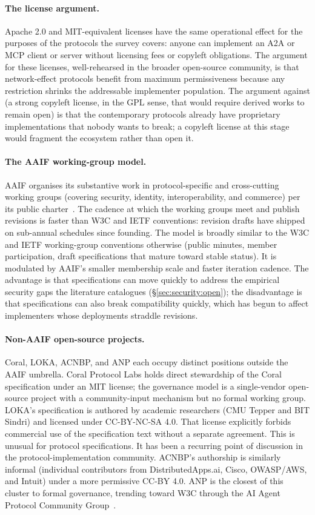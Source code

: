 \paragraph{The license argument.}
Apache 2.0 and MIT-equivalent licenses have the same
operational effect for the purposes of the protocols
the survey covers: anyone can implement an A2A or MCP
client or server without licensing fees or copyleft
obligations. The argument for these licenses, well-rehearsed
in the broader open-source community, is that
network-effect protocols benefit from maximum permissiveness
because any restriction shrinks the addressable
implementer population. The argument against (a strong
copyleft license, in the GPL sense, that would require
derived works to remain open) is that the contemporary
protocols already have proprietary implementations that
nobody wants to break; a copyleft license at this stage
would fragment the ecosystem rather than open it.

\paragraph{The AAIF working-group model.}
AAIF organises its substantive work in protocol-specific
and cross-cutting working groups (covering security,
identity, interoperability, and commerce) per its
public charter~\cite{lf_aaif}. The cadence at which the
working groups meet and publish revisions is faster than
W3C and IETF conventions: revision drafts have shipped on
sub-annual schedules since founding. The model is broadly
similar to the W3C and IETF working-group conventions
otherwise (public minutes, member participation, draft
specifications that mature toward stable status). It is
modulated by AAIF's smaller membership scale and faster
iteration cadence. The advantage is that specifications
can move quickly to address the empirical security gaps
the literature catalogues (\S\ref{sec:security:open}); the
disadvantage is that specifications can also break
compatibility quickly, which has begun to affect
implementers whose deployments straddle revisions.

\paragraph{Non-AAIF open-source projects.}
Coral, LOKA, ACNBP, and ANP each occupy distinct
positions outside the AAIF umbrella.
Coral Protocol Labs holds direct stewardship of the
Coral specification under an MIT license; the
governance model is a single-vendor open-source project
with a community-input mechanism but no formal working
group. LOKA's specification is authored by academic
researchers (CMU Tepper and BIT Sindri) and licensed
under CC-BY-NC-SA 4.0. That license explicitly
forbids commercial use of the specification text without
a separate agreement. This is unusual for protocol
specifications. It has been a recurring point of
discussion in the protocol-implementation community.
ACNBP's authorship is similarly informal (individual
contributors from DistributedApps.ai, Cisco, OWASP/AWS,
and Intuit) under a more permissive CC-BY 4.0. ANP is
the closest of this cluster to formal governance,
trending toward W3C through the AI Agent Protocol
Community Group~\cite{w3c_agent_protocol_cg}.

